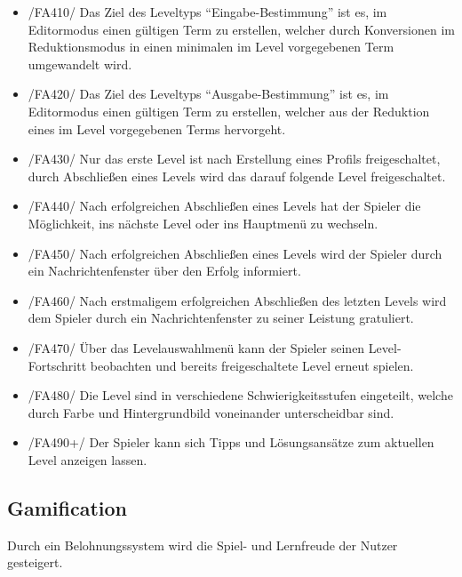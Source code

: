 \begin{itemize}
\item /FA410/ Das Ziel des Leveltyps "`Eingabe-Bestimmung"' ist es, im Editormodus einen gültigen Term zu erstellen, welcher durch Konversionen im Reduktionsmodus in einen minimalen im Level vorgegebenen Term umgewandelt wird.
\item /FA420/ Das Ziel des Leveltyps "`Ausgabe-Bestimmung"' ist es, im Editormodus einen gültigen Term zu erstellen, welcher aus der Reduktion eines im Level vorgegebenen Terms hervorgeht.
\item /FA430/ Nur das erste Level ist nach Erstellung eines Profils freigeschaltet, durch Abschließen eines Levels wird das darauf folgende Level freigeschaltet.
\item /FA440/ Nach erfolgreichen Abschließen eines Levels hat der Spieler die Möglichkeit, ins nächste Level oder ins Hauptmenü zu wechseln.
\item /FA450/ Nach erfolgreichen Abschließen eines Levels wird der Spieler durch ein Nachrichtenfenster über den Erfolg informiert.
\item /FA460/ Nach erstmaligem erfolgreichen Abschließen des letzten Levels wird dem Spieler durch ein Nachrichtenfenster zu seiner Leistung gratuliert.
\item /FA470/ Über das Levelauswahlmenü kann der Spieler seinen Level-Fortschritt beobachten und bereits freigeschaltete Level erneut spielen.
\item /FA480/ Die Level sind in verschiedene Schwierigkeitsstufen eingeteilt, welche durch Farbe und Hintergrundbild voneinander unterscheidbar sind.
\item /FA490+/ Der Spieler kann sich Tipps und Lösungsansätze zum aktuellen Level anzeigen lassen.
\end{itemize}

\subsection{Gamification}

Durch ein Belohnungssystem wird die Spiel- und Lernfreude der Nutzer gesteigert.

